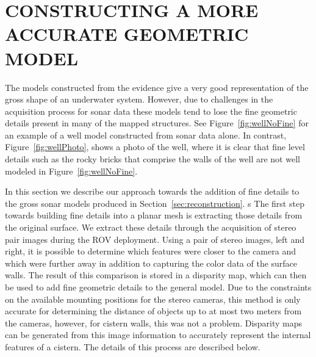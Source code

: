 \documentclass[a4paper,twoside]{article}
\begin{document}

\section{\uppercase{Constructing a more accurate geometric model}}
\label{sec:detail}

\noindent The models constructed from the evidence give a very good representation of the gross shape of an underwater system.  However, due to challenges in the acquisition process for sonar data these models tend to lose the fine geometric details present in many of the mapped structures.  See Figure~\ref{fig:wellNoFine} for an example of a well model constructed from sonar data alone.  In contrast, Figure~\ref{fig:wellPhoto}, shows a photo of the well, where it is clear that fine level details such as the rocky bricks that comprise the walls of the well are not well modeled in Figure~\ref{fig:wellNoFine}.

In this section we describe our approach towards the addition of fine details to the gross sonar models produced in Section~\ref{sec:reconstruction}. 
s%
The first step towards building fine details into a planar mesh is extracting those details from the original surface. 
We extract these details through the acquisition of stereo pair images during the ROV deployment.
Using a pair of stereo images, left and right, it is possible to determine which features were closer to the camera and which were further away in addition to capturing the color data of the surface walls.  
The result of this comparison is stored in a disparity map, which can then be used to add fine geometric details to the general model.  
Due to the constraints on the available mounting positions for the stereo cameras, this method is only accurate for determining the distance of objects up to at most two meters from the cameras, however,  for cistern walls, this was not a problem.  
Disparity maps can be generated from this image information to accurately represent the internal features of a cistern. 
The details of this process are described below.
\end{document}
